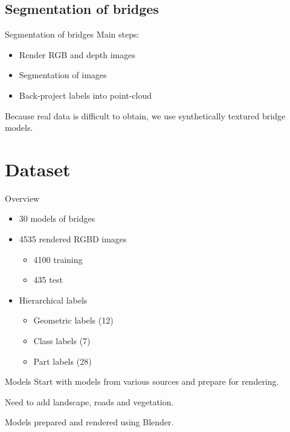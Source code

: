 \documentclass{beamer}
\begin{document}
\subsection{Segmentation of bridges}

\begin{frame}{Segmentation of bridges}
  Main steps:
  \begin{itemize}
  \item Render RGB and depth images
  \item Segmentation of images
  \item Back-project labels into point-cloud
  \end{itemize}
  Because real data is difficult to obtain, we use synthetically
  textured bridge models.
\end{frame}

\section{Dataset}

\begin{frame}{Overview}
  \begin{itemize}
  \item 30 models of bridges
  \item 4535 rendered RGBD images
    \begin{itemize}
    \item 4100 training
    \item 435 test
    \end{itemize}
  \item Hierarchical labels
    \begin{itemize}
    \item Geometric labels (12)
    \item Class labels (7)
    \item Part labels (28)
    \end{itemize}
  \end{itemize}
\end{frame}

\begin{frame}{Models}
  Start with models from various sources and prepare for rendering.

  Need to add landscape, roads and vegetation.

  Models prepared and rendered using Blender.
\end{frame}
\end{document}
